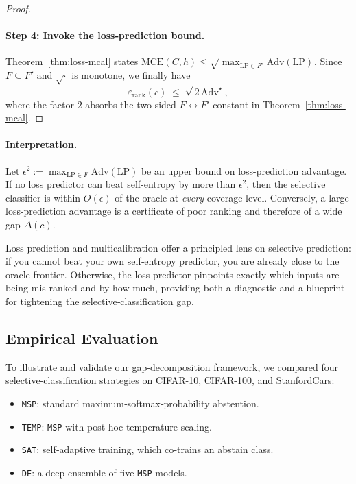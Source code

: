 \begin{proof}
\paragraph{Step 4:  Invoke the loss‑prediction bound.}
Theorem~\ref{thm:loss-mcal} states
\(
\mathrm{MCE}(C,h)
\le
\sqrt{\max_{\mathrm{LP}\in F'}\mathrm{Adv}(\mathrm{LP})}.
\)
Since \(F\subseteq F'\) and \(\sqrt{\cdot}\) is monotone, we finally have
\begin{equation}
\varepsilon_{\text{rank}}(c)
\;\le\;
\sqrt{\,2\,\mathrm{Adv}^{\star}},
\end{equation}
where the factor \(2\) absorbs the two‑sided
\(F\leftrightarrow F'\) constant in
Theorem~\ref{thm:loss-mcal}.
\end{proof}

\paragraph{Interpretation.}
Let \(\epsilon^2 := \max_{\mathrm{LP}\in F}\mathrm{Adv}(\mathrm{LP})\) be an upper bound on loss-prediction advantage.  
If no loss predictor can beat self-entropy by more than \(\epsilon^2\), then the selective classifier is within \(O(\epsilon)\) of the oracle at \emph{every} coverage level.  
Conversely, a large loss-prediction advantage is a certificate of poor ranking and therefore of a wide gap \(\Delta(c)\).

\begin{takeaway}
Loss prediction and multicalibration offer a principled lens on
selective prediction: if you cannot beat your own self‑entropy
predictor, you are already close to the oracle frontier.  Otherwise,
the loss predictor pinpoints exactly which inputs are being mis‑ranked
and by how much, providing both a diagnostic and a blueprint for
tightening the selective‑classification gap.
\end{takeaway}

\subsection{Empirical Evaluation}
\label{sec:adv_experiments}

To illustrate and validate our gap‐decomposition framework, we compared four selective‐classification strategies on CIFAR-10, CIFAR-100, and StanfordCars:

\begin{itemize}[leftmargin=1.2em]
  \item \texttt{MSP}: standard maximum‐softmax‐probability abstention.
  \item \texttt{TEMP}: \texttt{MSP} with post‐hoc temperature scaling.
  \item \texttt{SAT}: self‐adaptive training, which co‐trains an abstain class.
  \item \texttt{DE}: a deep ensemble of five \texttt{MSP} models.
\end{itemize}

